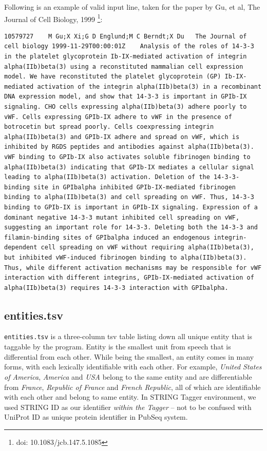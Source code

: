 Following is an example of valid input line, taken for the paper by Gu, et al, The Journal of Cell Biology, 1999 \footnote{doi: 10.1083/jcb.147.5.1085}:


\begin{lstlisting}[breaklines]
10579727	M Gu;X Xi;G D Englund;M C Berndt;X Du	The Journal of cell biology	1999-11-29T00:00:01Z	Analysis of the roles of 14-3-3 in the platelet glycoprotein Ib-IX-mediated activation of integrin alpha(IIb)beta(3) using a reconstituted mammalian cell expression model.	We have reconstituted the platelet glycoprotein (GP) Ib-IX-mediated activation of the integrin alpha(IIb)beta(3) in a recombinant DNA expression model, and show that 14-3-3 is important in GPIb-IX signaling. CHO cells expressing alpha(IIb)beta(3) adhere poorly to vWF. Cells expressing GPIb-IX adhere to vWF in the presence of botrocetin but spread poorly. Cells coexpressing integrin alpha(IIb)beta(3) and GPIb-IX adhere and spread on vWF, which is inhibited by RGDS peptides and antibodies against alpha(IIb)beta(3). vWF binding to GPIb-IX also activates soluble fibrinogen binding to alpha(IIb)beta(3) indicating that GPIb-IX mediates a cellular signal leading to alpha(IIb)beta(3) activation. Deletion of the 14-3-3-binding site in GPIbalpha inhibited GPIb-IX-mediated fibrinogen binding to alpha(IIb)beta(3) and cell spreading on vWF. Thus, 14-3-3 binding to GPIb-IX is important in GPIb-IX signaling. Expression of a dominant negative 14-3-3 mutant inhibited cell spreading on vWF, suggesting an important role for 14-3-3. Deleting both the 14-3-3 and filamin-binding sites of GPIbalpha induced an endogenous integrin-dependent cell spreading on vWF without requiring alpha(IIb)beta(3), but inhibited vWF-induced fibrinogen binding to alpha(IIb)beta(3). Thus, while different activation mechanisms may be responsible for vWF interaction with different integrins, GPIb-IX-mediated activation of alpha(IIb)beta(3) requires 14-3-3 interaction with GPIbalpha.
\end{lstlisting}

\subsection{entities.tsv}

\texttt{entities.tsv} is a three-column tsv table listing down all unique entity that is taggable by the program. Entity is the smallest unit from speech that is differential from each other. While being the smallest, an entity comes in many forms, with each lexically identifiable with each other. For example, \textit{United States of America}, \textit{America} and \textit{USA} belong to the same entity and are differentiable from \textit{France}, \textit{Republic of France} and \textit{French Republic}, all of which are identifiable with each other and belong to same entity. In STRING Tagger environment, we used STRING ID \citep{szklarczyk2011string} as our identifier \textit{within the Tagger} -- not to be confused with UniProt ID as unique protein identifier in PubSeq system.


